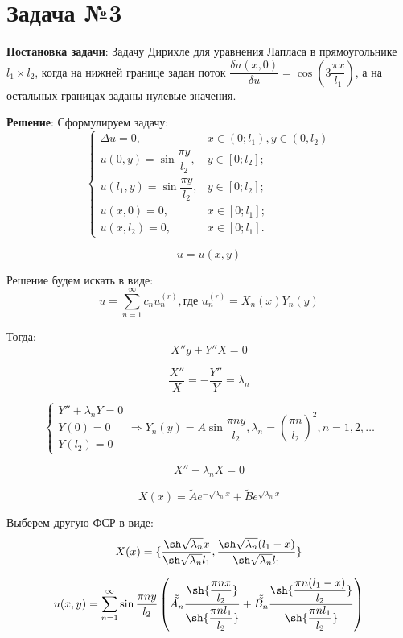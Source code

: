 \section{Задача №3}
\textbf{Постановка задачи}:
Задачу Дирихле для уравнения Лапласа в прямоугольнике $l_{1} \times l_{2}$, когда на нижней границе задан поток ${\dfrac{\delta u(x, 0)}{\delta u}} = \cos \left( {3\dfrac{\pi x}{l_{1}}} \right)$, а на остальных границах заданы нулевые значения.

\textbf{Решение}:
Сформулируем задачу:
$$
\begin{cases}
\Delta u = 0,&\text{$x\in(0;l_{1}), y \in (0, l_{2})$}\\
u(0, y) = \sin{\dfrac{\pi y}{l_{2}}},&\text{$y\in[0;l_{2}]$;}\\
u(l_{1}, y) = \sin{\dfrac{\pi y}{l_{2}}},&\text{$y\in[0;l_{2}]$;}\\
u(x, 0) = 0,&\text{$x\in[0;l_{1}]$;}\\
u(x, l_{2}) = 0,&\text{$x\in[0;l_{1}]$.}
\end{cases}
$$

$$u = u(x, y)$$

Решение будем искать в виде:
$$ u = \sum_{n=1}^{\infty} c_{n} u_{n}^{(r)}, \text{где $u_{n}^{(r)} = X_{n}(x) Y_{n}(y)$}$$

Тогда:
$$ X''y + Y''X = 0 $$

$$ \dfrac{X''}{X} = -\dfrac{Y''}{Y} = \lambda_{n}$$

$$
\begin{cases}
Y'' + \lambda_{n}Y = 0\\
Y(0) = 0\\
Y(l_{2}) = 0
\end{cases}
\Rightarrow Y_{n}(y) = A \sin{\dfrac{\pi ny}{l_{2}}}, \lambda_{n} = \left( \dfrac{\pi n}{l_{2}} \right)^{2}, n = 1, 2, \ldots
$$

$$ X'' - \lambda_{n}X = 0$$

$$ X(x) = \tilde{A}e^{-\sqrt{\lambda_{n}}x} + \tilde{B}e^{\sqrt{\lambda_{n}}x}$$

Выберем другую ФСР в виде:
$$ X(x) = \{ \dfrac{\sh \sqrt{\lambda_{n}}x}{\sh \sqrt{\lambda_{n}}l_{1}}, \dfrac{\sh \sqrt{\lambda_{n}}(l_{1} - x)}{\sh \sqrt{\lambda_{n}}l_{1}} \}$$

$$ u(x, y) = \sum_{n=1}^{\infty} \sin{\dfrac{\pi n y}{l_{2}}} \left( \tilde{\tilde{A_{n}}} \dfrac{\sh{\dfrac{\pi n x}{l_{2}}}}{\sh{\dfrac{\pi n l_{1}}{l_{2}}}} + \tilde{\tilde{B_{n}}} \dfrac{\sh{\dfrac{\pi n (l_{1} - x)}{l_{2}}}}{\sh{\dfrac{\pi n l_{1}}{l_{2}}}} \right) $$

